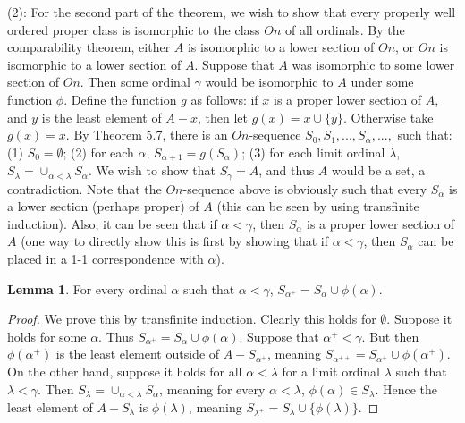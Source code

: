 \documentclass{article}
\theoremstyle{definition}
\newtheorem{lemma}[theorem]{Lemma}
\begin{document}
(2): For the second part of the theorem, we wish to show that every properly well ordered proper class is isomorphic to the class $On$ of all ordinals. 
By the comparability theorem, either $A$ is isomorphic to a lower section of 
$On$, or $On$ is isomorphic to a lower section of $A$. Suppose that $A$ was isomorphic to some lower section of $On$. Then some ordinal $\gamma$ would be 
isomorphic to $A$ under some function $\phi$. Define the function $g$ as follows: if $x$ is a proper lower section of $A$, and $y$ is the least element of $A-x$, then 
let $g(x)=x\cup\{y\}$. Otherwise take $g(x)=x$. By Theorem 5.7, 
there is an $On$-sequence $S_0,S_1,...,S_\alpha,...,$ such that:\newline
(1) $S_0=\emptyset$;\newline
(2) for each $\alpha$, $S_{\alpha+1}=g(S_\alpha)$;\newline
(3) for each limit ordinal $\lambda$, $S_\lambda=\cup_{\alpha<\lambda}S_\alpha$.\newline 
We wish to show that $S_\gamma=A$, and thus $A$ would be a set, a contradiction. Note that the $On$-sequence above is obviously such that 
every $S_\alpha$ is a lower section (perhaps proper) of $A$ (this can be seen by using transfinite induction). Also, it can be seen that if $\alpha<\gamma$, then 
$S_\alpha$ is a proper lower section of $A$ (one way to directly show this is first by showing that if $\alpha<\gamma$, then $S_\alpha$ can be placed in a 1-1 correspondence with 
$\alpha$).

\begin{lemma}
For every ordinal $\alpha$ such that $\alpha<\gamma$, $S_{\alpha^+}=S_\alpha\cup\phi(\alpha)$.
\end{lemma}
\begin{proof}
We prove this by transfinite induction. Clearly this holds for $\emptyset$. Suppose it holds for some $\alpha$. Thus 
$S_{\alpha^+}=S_\alpha\cup\phi(\alpha)$. Suppose that $\alpha^+<\gamma$. But then $\phi(\alpha^+)$ is the least element outside of $A-S_{\alpha^+}$, meaning 
$S_{\alpha^{++}}=S_{\alpha^+}\cup\phi(\alpha^+)$. On the other hand, suppose it holds for all $\alpha<\lambda$ for a limit ordinal 
$\lambda$ such that $\lambda<\gamma$. Then $S_\lambda=\cup_{\alpha<\lambda}S_\alpha$, meaning for every $\alpha<\lambda$, $\phi(\alpha)\in S_\lambda$. Hence 
the least element of $A-S_\lambda$ is $\phi(\lambda)$, meaning $S_{\lambda^+}=S_\lambda\cup\{\phi(\lambda)\}$.
\end{proof}
\end{document}
